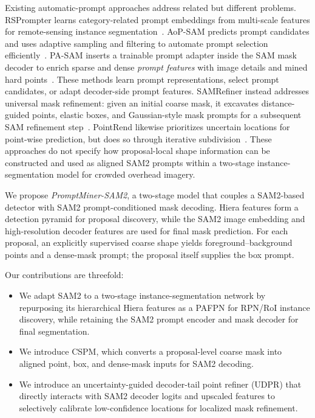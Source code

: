 \documentclass{article}
\begin{document}
Existing automatic-prompt approaches address related but different problems.
RSPrompter learns category-related prompt embeddings from multi-scale features
for remote-sensing instance segmentation~\cite{rsprompter}. AoP-SAM predicts
prompt candidates and uses adaptive sampling and filtering to automate prompt
selection efficiently~\cite{aopsam}. PA-SAM inserts a trainable prompt adapter
inside the SAM mask decoder to enrich sparse and dense \emph{prompt features}
with image details and mined hard points~\cite{pasam}. These methods learn
prompt representations, select prompt candidates, or adapt decoder-side prompt
features. SAMRefiner instead addresses universal mask refinement: given an
initial coarse mask, it excavates distance-guided points, elastic boxes, and
Gaussian-style mask prompts for a subsequent SAM refinement step~\cite{samrefiner}.
PointRend likewise prioritizes uncertain locations for point-wise prediction,
but does so through iterative subdivision~\cite{pointrend}. These approaches
do not specify how proposal-local shape information can be constructed and
used as aligned SAM2 prompts within a two-stage instance-segmentation model for
crowded overhead imagery.

We propose \emph{PromptMiner-SAM2}, a two-stage model that couples a
SAM2-based detector with SAM2 prompt-conditioned mask decoding. Hiera features
form a detection pyramid for proposal discovery, while the SAM2 image embedding
and high-resolution decoder features are used for final mask prediction. For
each proposal, an explicitly supervised coarse shape yields foreground--background
points and a dense-mask prompt; the proposal itself supplies the box prompt.

Our contributions are threefold:
\begin{itemize}
  \item We adapt SAM2 to a two-stage instance-segmentation network by
  repurposing its hierarchical Hiera features as a PAFPN for RPN/RoI instance
  discovery, while retaining the SAM2 prompt encoder and mask decoder
  for final segmentation.
  \item We introduce CSPM, which converts a proposal-level coarse mask into
  aligned point, box, and dense-mask inputs for SAM2 decoding.
  \item We introduce an uncertainty-guided decoder-tail point refiner (UDPR)
  that directly interacts with SAM2 decoder logits and upscaled features
  to selectively calibrate low-confidence locations for localized mask
  refinement.
\end{itemize}
\end{document}
